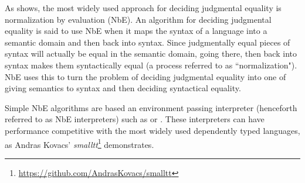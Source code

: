 As \citet{Abel2013} shows, the most widely used approach for deciding judgmental equality is normalization by evaluation (NbE).
An algorithm for deciding judgmental equality is said to use NbE when it maps the syntax of a language into a semantic domain and then back into syntax.
Since judgmentally equal pieces of syntax will actually be equal in the semantic domain, going there, then back into syntax makes them syntactically equal (a process referred to as ``normalization").
NbE uses this to turn the problem of deciding judgmental equality into one of giving semantics to syntax and then deciding syntactical equality.

Simple NbE algorithms are based an environment passing interpreter (henceforth referred to as NbE interpreters) such as \citet{Coquand1996} or \citet{Chapman2005}.
These interpreters can have performance competitive with the most widely used dependently typed languages, as Andras Kovacs' \textit{smalltt}\footnote{\url{https://github.com/AndrasKovacs/smalltt}} demonstrates.



